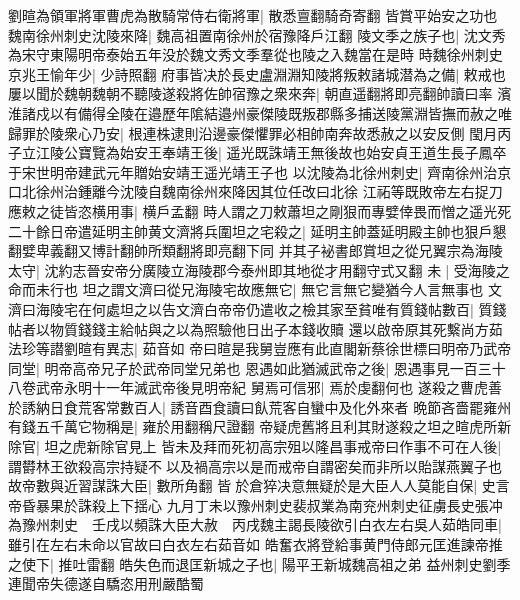 劉暄為領軍將軍曹虎為散騎常侍右衛將軍|{
	散悉亶翻騎奇寄翻}
皆賞平始安之功也　魏南徐州刺史沈陵來降|{
	魏高祖置南徐州於宿豫降戶江翻}
陵文季之族子也|{
	沈文秀為宋守東陽明帝泰始五年没於魏文秀文季羣從也陵之入魏當在是時}
時魏徐州刺史京兆王愉年少|{
	少詩照翻}
府事皆决於長史盧淵淵知陵將叛敕諸城潜為之備|{
	敕戒也}
屢以聞於魏朝魏朝不聽陵遂殺將佐帥宿豫之衆來奔|{
	朝直遥翻將即亮翻帥讀曰率}
濱淮諸戍以有備得全陵在邉歷年隂結邉州豪傑陵既叛郡縣多捕送陵黨淵皆撫而赦之唯歸罪於陵衆心乃安|{
	根連株逮則沿邊豪傑懼罪必相帥南奔故悉赦之以安反側}
閠月丙子立江陵公寶覽為始安王奉靖王後|{
	遥光既誅靖王無後故也始安貞王道生長子鳳卒于宋世明帝建武元年贈始安靖王遥光靖王子也}
以沈陵為北徐州刺史|{
	齊南徐州治京口北徐州治鍾離今沈陵自魏南徐州來降因其位任改曰北徐}
江祏等既敗帝左右捉刀應敕之徒皆恣横用事|{
	横戶孟翻}
時人謂之刀敕蕭坦之剛狠而專嬖倖畏而憎之遥光死二十餘日帝遣延明主帥黄文濟將兵圍坦之宅殺之|{
	延明主帥蓋延明殿主帥也狠戶懇翻嬖卑義翻又博計翻帥所類翻將即亮翻下同}
并其子袐書郎賞坦之從兄翼宗為海陵太守|{
	沈約志晉安帝分廣陵立海陵郡今泰州即其地從才用翻守式又翻}
未|{
	受海陵之命而未行也}
坦之謂文濟曰從兄海陵宅故應無它|{
	無它言無它變猶今人言無事也}
文濟曰海陵宅在何處坦之以告文濟白帝帝仍遣收之檢其家至貧唯有質錢帖數百|{
	質錢帖者以物質錢錢主給帖與之以為照驗他日出子本錢收贖}
還以啟帝原其死繫尚方茹法珍等譛劉暄有異志|{
	茹音如}
帝曰暄是我舅豈應有此直閣新蔡徐世標曰明帝乃武帝同堂|{
	明帝高帝兄子於武帝同堂兄弟也}
恩遇如此猶滅武帝之後|{
	恩遇事見一百三十八卷武帝永明十一年滅武帝後見明帝紀}
舅焉可信邪|{
	焉於虔翻何也}
遂殺之曹虎善於誘納日食荒客常數百人|{
	誘音酉食讀曰飤荒客自蠻中及化外來者}
晩節吝嗇罷雍州有錢五千萬它物稱是|{
	雍於用翻稱尺證翻}
帝疑虎舊將且利其財遂殺之坦之暄虎所新除官|{
	坦之虎新除官見上}
皆未及拜而死初高宗殂以隆昌事戒帝曰作事不可在人後|{
	謂欎林王欲殺高宗持疑不以及禍高宗以是而戒帝自謂密矣而非所以貽謀燕翼子也}
故帝數與近習謀誅大臣|{
	數所角翻}
皆於倉猝决意無疑於是大臣人人莫能自保|{
	史言帝昏暴果於誅殺上下揺心}
九月丁未以豫州刺史裴叔業為南兖州刺史征虜長史張冲為豫州刺史　壬戌以頻誅大臣大赦　丙戌魏主謁長陵欲引白衣左右吳人茹皓同車|{
	雖引在左右未命以官故曰白衣左右茹音如}
皓奮衣將登給事黄門侍郎元匡進諫帝推之使下|{
	推吐雷翻}
皓失色而退匡新城之子也|{
	陽平王新城魏高祖之弟}
益州刺史劉季連聞帝失德遂自驕恣用刑嚴酷蜀

